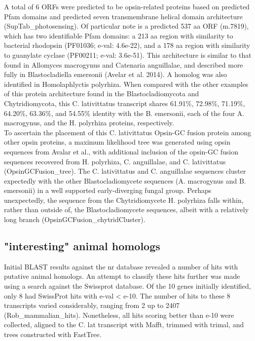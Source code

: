 \indent A total of 6 ORFs were predicted to be opsin-related proteins based on predicted Pfam domains and predicted seven transmembrane helical domain architecture (SupTab\_photosensing). Of particular note is a predicted 537 aa ORF (m.7819), which has two identifiable Pfam domains: a 213 aa region with similarity to bacterial rhodopsin (PF01036; e-val: 4.6e-22), and a 178 aa region with similarity to guanylate cyclase (PF00211; e-val: 3.6e-51). This architecture is similar to that found in Allomyces macrogynus and Catenaria anguillalae, and described more fully in Blastocladiella emersonii (Avelar et al. 2014). A homolog was also identified in Homolaphlyctis polyrhiza. When compared with the other examples of this protein architecture found in the Blastocladiomycota and Chytridiomycota, this C. lativittatus transcript shares 61.91\%, 72.98\%, 71.19\%, 64.20\%, 63.36\%, and 54.55\% identity with the B. emersonii, each of the four A. macrogynus, and the H. polyrhiza proteins, respectively.  \\
\indent To ascertain the placement of this C. lativittatus Opsin-GC fusion protein among other opsin proteins, a maximum likelihood tree was generated using opsin sequences from Avalar et al., with additional inclusion of the opsin-GC fusion sequences recovered from H. polyrhiza, C. anguillalae, and C. lativittatus (OpsinGCFusion\_tree). The C. lativittatus and C. anguillalae sequences cluster expectedly with the other Blastocladiomycete sequences (A. macrogynus and B. emersonii) in a well supported early-diverging fungal group. Perhaps unexpectedly, the sequence from the Chytridiomycete H. polyrhiza falls within, rather than outside of, the Blastocladiomycete sequences, albeit with a relatively long branch (OpsinGCFusion\_chytridCluster).\\
\subsection{"interesting" animal homologs}
Initial BLAST results against the nr database revealed a number of hits with putative animal homologs. An attempt to classify these hits further was made using a search against the Swissprot database. Of the 10 genes initially identified, only 8 had SwissProt hits with e-val < e-10. The number of hits to these 8 transcripts varied considerably, ranging from 2 up to 2407 (Rob\_mammalian\_hits). Nonetheless, all hits scoring better than e-10 were collected, aligned to the C. lat transcript with Mafft, trimmed with trimal, and trees constructed with FastTree.\\
